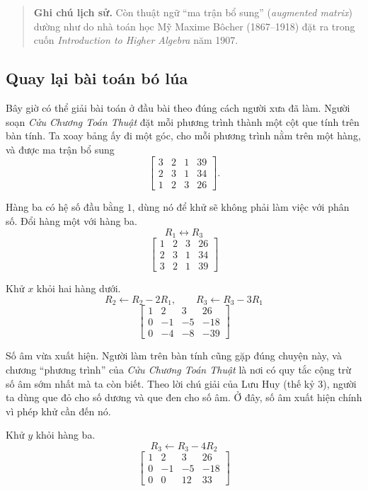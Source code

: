 \documentclass[12pt,a4paper]{article}
\begin{document}
\begin{quote}
\textbf{Ghi chú lịch sử.} Còn thuật ngữ ``ma trận bổ sung'' (\emph{augmented matrix}) dường như do nhà toán học Mỹ Maxime Bôcher (1867--1918) đặt ra trong cuốn \emph{Introduction to Higher Algebra} năm 1907.
\end{quote}

\subsection{Quay lại bài toán bó lúa}

Bây giờ có thể giải bài toán ở đầu bài theo đúng cách người xưa đã làm. Người soạn \emph{Cửu Chương Toán Thuật} đặt mỗi phương trình thành một cột que tính trên bàn tính. Ta xoay bảng ấy đi một góc, cho mỗi phương trình nằm trên một hàng, và được ma trận bổ sung
$$ \left[ \begin{array}{ccc|c} 3 & 2 & 1 & 39 \\ 2 & 3 & 1 & 34 \\ 1 & 2 & 3 & 26 \end{array} \right]. $$

Hàng ba có hệ số đầu bằng \(1\), dùng nó để khử sẽ không phải làm việc với phân số. Đổi hàng một với hàng ba.
$$ R_1\leftrightarrow R_3 $$
$$ \left[ \begin{array}{ccc|c} 1 & 2 & 3 & 26 \\ 2 & 3 & 1 & 34 \\ 3 & 2 & 1 & 39 \end{array} \right] $$

Khử \(x\) khỏi hai hàng dưới.
$$ R_2\leftarrow R_2-2R_1,\qquad R_3\leftarrow R_3-3R_1 $$
$$ \left[ \begin{array}{ccc|c} 1 & 2 & 3 & 26 \\ 0 & -1 & -5 & -18 \\ 0 & -4 & -8 & -39 \end{array} \right] $$

Số âm vừa xuất hiện. Người làm trên bàn tính cũng gặp đúng chuyện này, và chương ``phương trình'' của \emph{Cửu Chương Toán Thuật} là nơi có quy tắc cộng trừ số âm sớm nhất mà ta còn biết. Theo lời chú giải của Lưu Huy (thế kỷ 3), người ta dùng que đỏ cho số dương và que đen cho số âm. Ở đây, số âm xuất hiện chính vì phép khử cần đến nó.

Khử \(y\) khỏi hàng ba.
$$ R_3\leftarrow R_3-4R_2 $$
$$ \left[ \begin{array}{ccc|c} 1 & 2 & 3 & 26 \\ 0 & -1 & -5 & -18 \\ 0 & 0 & 12 & 33 \end{array} \right] $$
\end{document}
